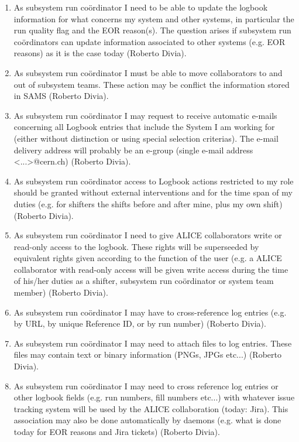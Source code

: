 \documentclass[a4paper,11pt]{book}
\begin{document}
\begin{enumerate}
  \item As subsystem run co\"ordinator I need to be able to update the logbook information for what concerns my system and other systems, in particular the run quality flag and the EOR reason(s). The question arises if subsystem run co\"ordinators can update information associated to other systems (e.g. EOR reasons) as it is the case today (Roberto Divia).
  \item As subsystem run co\"ordinator I must be able to move collaborators to and out of subsystem teams. These action may be conflict the information stored in SAMS (Roberto Divia).
  \item As subsystem run co\"ordinator I may request to receive automatic e-mails concerning all Logbook entries that include the System I am working for (either without distinction or using special selection criterias). The e-mail delivery address will probably be an e-group (single e-mail address <...>@cern.ch) (Roberto Divia).
  \item As subsystem run co\"ordinator access to Logbook actions restricted to my role should be granted without external interventions and for the time span of my duties (e.g. for shifters the shifts before and after mine, plus my own shift) (Roberto Divia).
  \item As subsystem run co\"ordinator I need to give ALICE collaborators write or read-only access to the logbook. These rights will be superseeded by equivalent rights given according to the function of the user (e.g. a ALICE collaborator with read-only access will be given write access during the time of his/her duties as a shifter, subsystem run co\"ordinator or system team member) (Roberto Divia).
  \item As subsystem run co\"ordinator I may have to cross-reference log entries (e.g. by URL, by unique Reference ID, or by run number)  (Roberto Divia).
  \item  As subsystem run co\"ordinator I may need to attach files to log entries. These files may contain text or binary information (PNGs, JPGs etc...) (Roberto Divia).
  \item As subsystem run co\"ordinator I may need to cross reference log entries or other logbook fields (e.g. run numbers, fill numbers etc...) with whatever issue tracking system will be used by the ALICE collaboration (today: Jira). This association may also be done automatically by daemons (e.g. what is done today for EOR reasons and Jira tickets) (Roberto Divia).

\end{enumerate}
\end{document}
